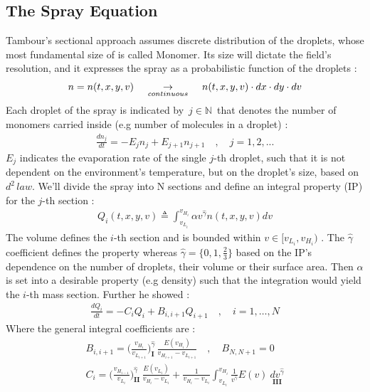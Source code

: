 \documentclass[12pt]{article}
\numberwithin{equation}{section}
\begin{document}
\begin{flushleft}
\subsection{The Spray Equation}
Tambour’s sectional approach assumes discrete distribution of the droplets, whose most fundamental size of is called Monomer. Its size will dictate the field’s resolution, and it expresses the spray as a probabilistic function of the droplets :
\begin{align} \label{2_sections}
n = n(t, x, y, v) \hspace{4mm} \underset{continuous}{\rightarrow} \hspace{4mm} n(t, x, y, v) \cdot dx \cdot dy \cdot dv
\end{align}
Each droplet of the spray is indicated by\ $j \in \mathbb{N}$\ that denotes the number of monomers carried inside (e.g number of molecules in a droplet) :
\begin{align} %
\frac{d n_j}{dt} = -E_j n_j + E_{j+1} n_{j+1} \quad , \quad j =1, 2, ...
\end{align}
$E_j$ indicates the evaporation rate of the single $j$-th droplet, such that it is not dependent on the environment's temperature, but on the droplet’s size, based on $d^2\, law$. We’ll divide the spray into N sections and define an integral property (IP) for the $j$-th section :
\begin{align} \label{2_Q_i}
Q_i(t, x, y, v) \triangleq \int_{v_{L_i}}^{v_{H_i}} \alpha v^{\hat{\gamma}} n(t, x, y, v) dv
\end{align}
The volume defines the $i$-th section and is bounded within $v \in [v_{L_i} , v_{H_i} )$ . The $\hat{\gamma}$ coefficient defines the property whereas $\hat{\gamma} = \{0 , 1 , \frac{2}{3} \}$ based on the IP’s dependence on the number of droplets, their volume or their surface area. Then $\alpha$ is set into a desirable property (e.g density) such that the integration would yield the $i$-th mass section. Further he showed :
\begin{align}  \label{2_dQ_i}
\frac{d Q_i}{dt} = -C_i Q_i + B_{i, i+1} Q_{i+1} \quad , \quad i=1, \ldots, N
\end{align}
Where the general integral coefficients are :
\begin{align} 
B_{i, i+1} = \Big( \frac{v_{H_i}}{v_{L_{i+1}}} \Big)_{\textbf{I}}^{\hat{\gamma}} \, \frac{E(v_{H_i})}{v_{H_{i+1}} - v_{L_{i+1}} } \quad , \quad B_{N, N+1}=0  \label{2_B_i} \\
C_{i} = \Big( \frac{v_{H_{i-1}}}{v_{L_{i}}} \Big)^{\hat{\gamma}}_{\textbf{II}} \, \frac{E(v_{L_i})}{v_{H_{i}} - v_{L_{i}} } + \frac{1}{v_{H_{i}} - v_{L_{i}} } \int_{v_{L_i}}^{v_{H_i}} \frac{1}{v^{\hat{\gamma}}} E(v)\ \underset{\textbf{III}}{dv^{\hat{\gamma}}} \label{2_C_i}
\end{align}


\end{flushleft}
\end{document}
